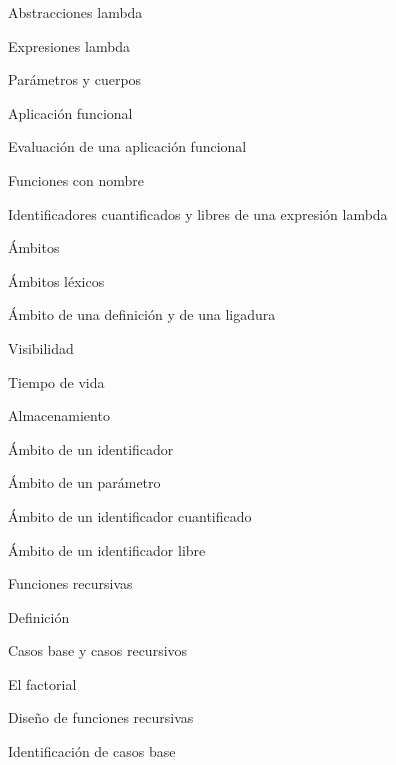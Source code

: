 \begin{longenum}
    \begin{longenum}
        \item Abstracciones lambda
        \begin{longenum}
            \item Expresiones lambda
            \item Parámetros y cuerpos
            \item Aplicación funcional
            \begin{longenum}
                \item Evaluación de una aplicación funcional
                \item Funciones con nombre
            \end{longenum}
            \item Identificadores cuantificados y libres de una expresión lambda
        \end{longenum}
        \item Ámbitos
        \begin{longenum}
            \item Ámbitos léxicos
            \item Ámbito de una definición y de una ligadura
            \begin{longenum}
                \item Visibilidad
                \item Tiempo de vida
                \item Almacenamiento
            \end{longenum}
            \item Ámbito de un identificador
            \item Ámbito de un parámetro
            \item Ámbito de un identificador cuantificado
            \item Ámbito de un identificador libre
        \end{longenum}
        \item Funciones recursivas \opcional\
        \begin{longenum}
            \item Definición
            \item Casos base y casos recursivos
            \item El factorial
            \item Diseño de funciones recursivas
            \begin{longenum}
                \item Identificación de casos base

\end{longenum}
\end{longenum}
\end{longenum}
\end{longenum}
